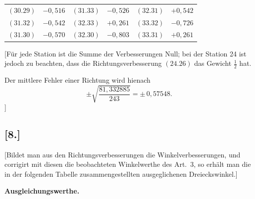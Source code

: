 \documentclass[12pt,a4paper]{article}
\theoremstyle{plain}
\theoremstyle{definition}
\theoremstyle{remark}
\begin{document}
\begin{center}
\begin{tabular}{r@{${}= {}$}lr@{${}= {}$}lr@{${}= {}$}l}
$(30.29)$ & $-0{,}516$ & $(31.33)$ & $-0{,}526$ & $(32.31)$ & $+0{,}542$\\
$(31.32)$ & $-0{,}542$ & $(32.33)$ & $+0{,}261$ & $(33.32)$ & $-0{,}726$\\
$(31.30)$ & $-0{,}570$ & $(32.30)$ & $-0{,}803$ & $(33.31)$ & $+0{,}261$
\end{tabular}
\end{center}

[F\"ur jede Station ist die Summe der Verbesserungen Null; bei der Station 24 ist jedoch zu beachten, dass die Richtungsverbesserung $(24.26)$ das Gewicht $\tfrac{1}{2}$ hat.

Der mittlere Fehler einer Richtung wird hienach
\[\pm\sqrt{\frac{81{,}332885}{243}} = \pm\,0{,}57548.\]]

\newpage
\subsection*{[8.]}
\label{subsec:netz8}

[Bildet man aus den Richtungsverbesserungen die Winkelverbesserungen, und corrigirt mit diesen die beobachteten Winkelwerthe des Art.\ 3, so erh\"alt man die in der folgenden Tabelle zusammengestellten ausgeglichenen Dreieckswinkel.]

\medskip\noindent\textbf{Ausgleichungswerthe.}
\end{document}

